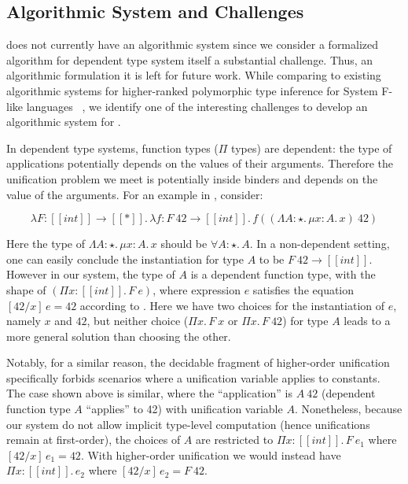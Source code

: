 \subsection{Algorithmic System and Challenges}

\name does not currently have an algorithmic system since we
consider a formalized algorithm for dependent type system itself a
substantial challenge. Thus, an algorithmic formulation it is left for future work.
While comparing to existing algorithmic systems
for higher-ranked polymorphic type inference for System F-like languages
~\cite{dunfield2013complete,zhao19mechanical},
we identify one of the interesting challenges to develop an algorithmic system for \name.

In dependent type systems, function types ($\Pi$ types) are dependent:
the type of applications potentially depends on the values of their arguments.
Therefore the unification problem we meet is potentially inside binders and
depends on the value of the arguments. For an example in \name, consider:

\begin{equation*}
    \lambda F : [[int]] \rightarrow [[*]].\, \lambda f : F~42 \rightarrow [[int]].\, f ((\Lambda A : \star.\,\mu x : A.\, x)~42)
\end{equation*}

Here the type of $\Lambda A : \star.\,\mu x : A.\, x$ should be $\forall A : \star.\, A$.
In a non-dependent setting, one can easily conclude the instantiation for type $A$ to be
$F~42 \rightarrow [[int]]$. However in our system, the type of $A$ is a
dependent function type, with the shape of $(\Pi x : [[int]].\, F~e)$,
where expression $e$ satisfies the equation $[42/x]\,e = 42$ according to .
Here we have two choices for the instantiation of $e$, namely $x$ and $42$,
but neither choice ($\Pi x.\, F~x$ or $\Pi x.\, F~42$) for type $A$ leads to a more general
solution than choosing the other.

Notably, for a similar reason, the decidable
fragment of higher-order unification~\cite{patternunification} specifically
forbids scenarios where a unification variable applies to constants.
The case shown above is similar, where the ``application'' is $A~42$
(dependent function type $A$ ``applies'' to 42) with unification variable $A$.
Nonetheless, because our system do not allow implicit type-level
computation (hence unifications remain at first-order),
the choices of $A$ are restricted to $\Pi x : [[int]].\,F~e_1$ where $[42/x]\,e_1 = 42$.
With higher-order unification we would instead
have $\Pi x : [[int]].\, e_2$ where $[42/x]\,e_2 = F~42$.

